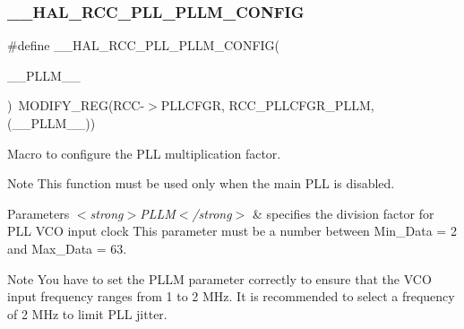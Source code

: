 \subsubsection{\texorpdfstring{\+\_\+\+\_\+\+H\+A\+L\+\_\+\+R\+C\+C\+\_\+\+P\+L\+L\+\_\+\+P\+L\+L\+M\+\_\+\+C\+O\+N\+F\+IG}{\_\_HAL\_RCC\_PLL\_PLLM\_CONFIG}}
{\footnotesize\ttfamily \#define \+\_\+\+\_\+\+H\+A\+L\+\_\+\+R\+C\+C\+\_\+\+P\+L\+L\+\_\+\+P\+L\+L\+M\+\_\+\+C\+O\+N\+F\+IG(\begin{DoxyParamCaption}\item[{}]{\+\_\+\+\_\+\+P\+L\+L\+M\+\_\+\+\_\+ }\end{DoxyParamCaption})~M\+O\+D\+I\+F\+Y\+\_\+\+R\+EG(R\+CC-\/$>$P\+L\+L\+C\+F\+GR, R\+C\+C\+\_\+\+P\+L\+L\+C\+F\+G\+R\+\_\+\+P\+L\+LM, (\+\_\+\+\_\+\+P\+L\+L\+M\+\_\+\+\_\+))}



Macro to configure the P\+LL multiplication factor. 

\begin{DoxyNote}{Note}
This function must be used only when the main P\+LL is disabled. 
\end{DoxyNote}

\begin{DoxyParams}{Parameters}
{\em $<$strong$>$\+P\+L\+L\+M$<$/strong$>$} & specifies the division factor for P\+LL V\+CO input clock This parameter must be a number between Min\+\_\+\+Data = 2 and Max\+\_\+\+Data = 63. \\
\hline
\end{DoxyParams}
\begin{DoxyNote}{Note}
You have to set the P\+L\+LM parameter correctly to ensure that the V\+CO input frequency ranges from 1 to 2 M\+Hz. It is recommended to select a frequency of 2 M\+Hz to limit P\+LL jitter. 
\end{DoxyNote}
\mbox{\label{group___r_c_c___p_l_l___configuration_gaf9a8466f991888332ec978dc92c62d7d}} 
